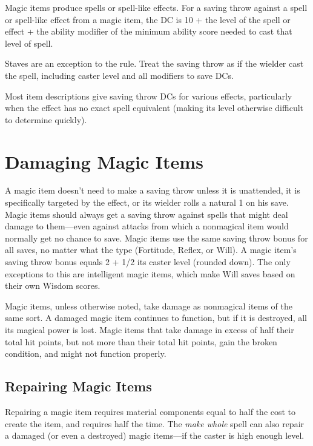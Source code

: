 				
Magic items produce spells or spell-like effects. For a saving throw against a spell or spell-like effect from a magic item, the DC is 10 + the level of the spell or effect + the ability modifier of the minimum ability score needed to cast that level of spell. 
				
Staves are an exception to the rule. Treat the saving throw as if the wielder cast the spell, including caster level and all modifiers to save DCs. 
				
Most item descriptions give saving throw DCs for various effects, particularly when the effect has no exact spell equivalent (making its level otherwise difficult to determine quickly).
				
\section{Damaging Magic Items}

				
A magic item doesn't need to make a saving throw unless it is unattended, it is specifically targeted by the effect, or its wielder rolls a natural 1 on his save. Magic items should always get a saving throw against spells that might deal damage to them---even against attacks from which a nonmagical item would normally get no chance to save. Magic items use the same saving throw bonus for all saves, no matter what the type (Fortitude, Reflex, or Will). A magic item's saving throw bonus equals 2 + 1/2 its caster level (rounded down). The only exceptions to this are intelligent magic items, which make Will saves based on their own Wisdom scores.
				
Magic items, unless otherwise noted, take damage as nonmagical items of the same sort. A damaged magic item continues to function, but if it is destroyed, all its magical power is lost. Magic items that take damage in excess of half their total hit points, but not more than their total hit points, gain the broken condition, and might not function properly.
				
\subsection{Repairing Magic Items}

				
Repairing a magic item requires material components equal to half the cost to create the item, and requires half the time. The \textit{make whole }spell can also repair a damaged (or even a destroyed) magic items---if the caster is high enough level.
				
